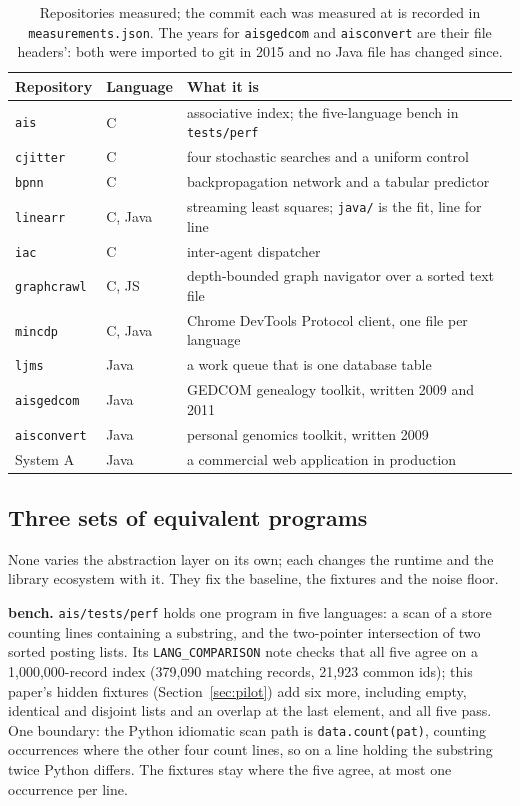 \documentclass[11pt,a4paper]{article}
\begin{document}
\begin{table}[H]
\centering
\small
\begin{tabular}{lll}
\toprule
Repository & Language & What it is \\
\midrule
\texttt{ais} & C & associative index; the five-language bench in \texttt{tests/perf} \\
\texttt{cjitter} & C & four stochastic searches and a uniform control \\
\texttt{bpnn} & C & backpropagation network and a tabular predictor \\
\texttt{linearr} & C, Java & streaming least squares; \texttt{java/} is the fit, line for line \\
\texttt{iac} & C & inter-agent dispatcher \\
\texttt{graphcrawl} & C, JS & depth-bounded graph navigator over a sorted text file \\
\texttt{mincdp} & C, Java & Chrome DevTools Protocol client, one file per language \\
\texttt{ljms} & Java & a work queue that is one database table \\
\texttt{aisgedcom} & Java & GEDCOM genealogy toolkit, written 2009 and 2011 \\
\texttt{aisconvert} & Java & personal genomics toolkit, written 2009 \\
System A & Java & a commercial web application in production \\
\bottomrule
\end{tabular}
\caption{Repositories measured; the commit each was measured at is recorded in \texttt{measurements.json}. The years for \texttt{aisgedcom} and \texttt{aisconvert} are their file headers': both were imported to git in 2015 and no Java file has changed since.}
\label{tab:repos}
\end{table}

\subsection{Three sets of equivalent programs}

None varies the abstraction layer on its own; each changes the runtime and the library ecosystem with it. They fix the baseline, the fixtures and the noise floor.

\textbf{bench.} \texttt{ais/tests/perf} holds one program in five languages: a scan of a store counting lines containing a substring, and the two-pointer intersection of two sorted posting lists. Its \texttt{LANG\_COMPARISON} note \cite{langcmp} checks that all five agree on a 1,000,000-record index (379,090 matching records, 21,923 common ids); this paper's hidden fixtures (Section~\ref{sec:pilot}) add six more, including empty, identical and disjoint lists and an overlap at the last element, and all five pass. One boundary: the Python idiomatic scan path is \texttt{data.count(pat)}, counting occurrences where the other four count lines, so on a line holding the substring twice Python differs. The fixtures stay where the five agree, at most one occurrence per line.
\end{document}

